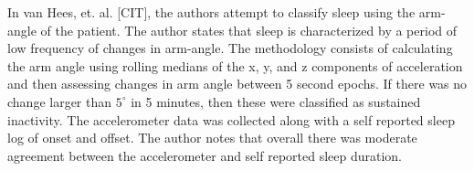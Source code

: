            In van Hees, et. al. [CIT], the authors attempt to classify sleep using the arm-angle of the patient. The author states that sleep is characterized by a period of low frequency of changes in arm-angle. The methodology consists of calculating the arm angle using rolling medians of the x, y, and z components of acceleration and then assessing changes in arm angle between 5 second epochs. If there was no change larger than $5^{\circ}$ in 5 minutes, then these were classified as sustained inactivity. The accelerometer data was collected along with a self reported sleep log of onset and offset. The author notes that overall there was moderate agreement between the accelerometer and self reported sleep duration.